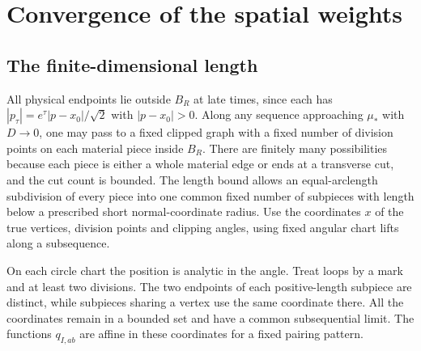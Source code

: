 \section{Convergence of the spatial weights}\label{sec:weights}

\subsection{The finite-dimensional length}\label{sec:core}

All physical endpoints lie outside \(B_R\) at late times, since each has \(|p_\tau|=e^\tau|p-x_0|/\sqrt2\) with \(|p-x_0|>0\). Along any sequence approaching \(\mu_*\) with \(D\to0\), one may pass to a fixed clipped graph with a fixed number of division points on each material piece inside \(B_R\). There are finitely many possibilities because each piece is either a whole material edge or ends at a transverse cut, and the cut count is bounded. The length bound allows an equal-arclength subdivision of every piece into one common fixed number of subpieces with length below a prescribed short normal-coordinate radius. Use the coordinates \(x\) of the true vertices, division points and clipping angles, using fixed angular chart lifts along a subsequence.

On each circle chart the position is analytic in the angle. Treat loops by a mark and at least two divisions. The two endpoints of each positive-length subpiece are distinct, while subpieces sharing a vertex use the same coordinate there. All the coordinates remain in a bounded set and have a common subsequential limit. The functions \(q_{I,ab}\) are affine in these coordinates for a fixed pairing pattern.

